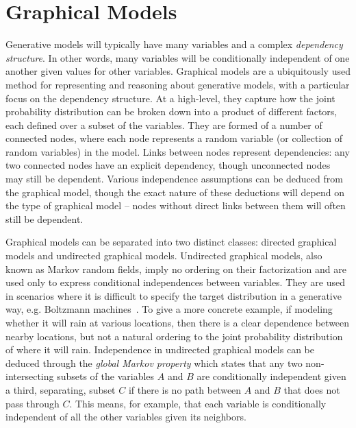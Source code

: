 
\section{Graphical Models}
\label{sec:bayes:paradigm:graph}

Generative models will typically have many variables and a complex \emph{dependency structure}.
In other words, many variables will be conditionally independent of one another given values for
other variables.  Graphical models are a ubiquitously used method for representing and reasoning
about generative models, with a particular focus on the dependency structure.  At a high-level, they
capture how the joint probability distribution can be broken down into a product of different factors, 
each defined over
a subset of the variables.  They are formed of a number of connected nodes, where each node
represents a random variable (or collection of random variables) in the model.  Links between nodes
represent dependencies: any two connected nodes have an explicit dependency, though unconnected
nodes may still be dependent.
Various independence assumptions can be deduced from the graphical model, though the exact nature
of these deductions will depend on the type of graphical model -- nodes without direct links
between them will often still be dependent.

Graphical models can be separated into two distinct classes: directed graphical
models and undirected graphical models.  Undirected graphical models, also known as Markov random
fields, imply no ordering on their factorization and are used only to express conditional independences
between variables.  They are used in scenarios where it is difficult to specify the target distribution in a
generative way, e.g.  Boltzmann machines~\citep{ackley1985learning}.  To give 
a more concrete example, if modeling whether it will rain at various locations, then there
is a clear dependence between nearby locations, but not a natural ordering to the joint probability
distribution of where it will rain.   Independence in undirected graphical models can be deduced
through the \emph{global Markov property} which states that any two non-intersecting subsets of the 
variables $A$ and $B$ are
conditionally independent given a third, separating, subset $C$ if there is no path between $A$ and
$B$ that does not pass through $C$.  This means, for example, that each variable is conditionally
independent of all the other variables given its neighbors.

